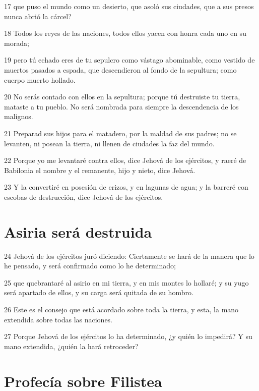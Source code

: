 \par 17 que puso el mundo como un desierto, que asoló sus ciudades, que a sus presos nunca abrió la cárcel?
\par 18 Todos los reyes de las naciones, todos ellos yacen con honra cada uno en su morada;
\par 19 pero tú echado eres de tu sepulcro como vástago abominable, como vestido de muertos pasados a espada, que descendieron al fondo de la sepultura; como cuerpo muerto hollado.
\par 20 No serás contado con ellos en la sepultura; porque tú destruiste tu tierra, mataste a tu pueblo. No será nombrada para siempre la descendencia de los malignos.
\par 21 Preparad sus hijos para el matadero, por la maldad de sus padres; no se levanten, ni posean la tierra, ni llenen de ciudades la faz del mundo.
\par 22 Porque yo me levantaré contra ellos, dice Jehová de los ejércitos, y raeré de Babilonia el nombre y el remanente, hijo y nieto, dice Jehová.
\par 23 Y la convertiré en posesión de erizos, y en lagunas de agua; y la barreré con escobas de destrucción, dice Jehová de los ejércitos. 

\section*{Asiria será destruida}

\par 24 Jehová de los ejércitos juró diciendo: Ciertamente se hará de la manera que lo he pensado, y será confirmado como lo he determinado;
\par 25 que quebrantaré al asirio en mi tierra, y en mis montes lo hollaré; y su yugo será apartado de ellos, y su carga será quitada de su hombro.
\par 26 Este es el consejo que está acordado sobre toda la tierra, y esta, la mano extendida sobre todas las naciones.
\par 27 Porque Jehová de los ejércitos lo ha determinado, ¿y quién lo impedirá? Y su mano extendida, ¿quién la hará retroceder?

\section*{Profecía sobre Filistea}

